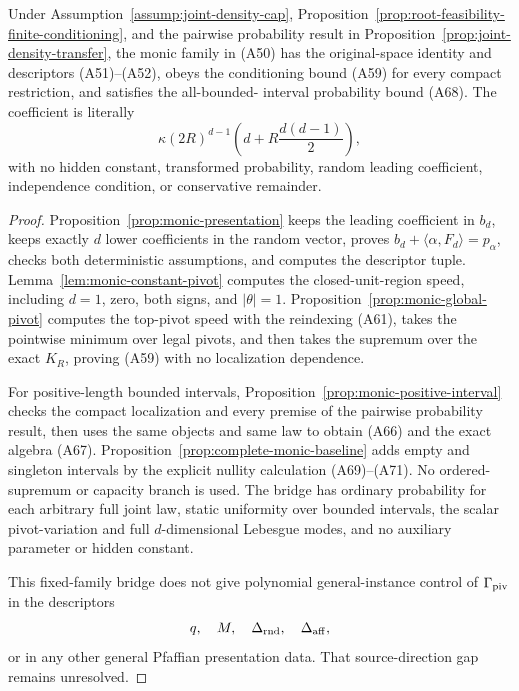 \begin{proposition}
\label{prop:exact-monic-recovery}
Under Assumption~\ref{assump:joint-density-cap},
Proposition~\ref{prop:root-feasibility-finite-conditioning}, and the
pairwise probability result in Proposition~\ref{prop:joint-density-transfer},
the monic family in \textup{(A50)} has the original-space identity and
descriptors \textup{(A51)}--\textup{(A52)}, obeys the conditioning bound
\textup{(A59)} for every compact restriction, and satisfies the all-bounded-
interval probability bound \textup{(A68)}.  The coefficient is literally
\[
\kappa(2R)^{d-1}\left(d+R\frac{d(d-1)}2\right),
\]
with no hidden constant, transformed probability, random leading
coefficient, independence condition, or conservative remainder.
\end{proposition}

\begin{proof}
Proposition~\ref{prop:monic-presentation} keeps the leading coefficient in
$b_d$, keeps exactly $d$ lower coefficients in the random vector, proves
$b_d+\langle\alpha,F_d\rangle=p_\alpha$, checks both deterministic
assumptions, and computes the descriptor tuple.  Lemma~\ref{lem:monic-constant-pivot}
computes the closed-unit-region speed, including $d=1$, zero, both signs,
and $|\theta|=1$.  Proposition~\ref{prop:monic-global-pivot} computes the
top-pivot speed with the reindexing \textup{(A61)}, takes the pointwise
minimum over legal pivots, and then takes the supremum over the exact
$K_R$, proving \textup{(A59)} with no localization dependence.

For positive-length bounded intervals,
Proposition~\ref{prop:monic-positive-interval} checks the compact
localization and every premise of the pairwise probability result, then
uses the same objects and same law to obtain \textup{(A66)} and the exact
algebra \textup{(A67)}.  Proposition~\ref{prop:complete-monic-baseline}
adds empty and singleton intervals by the explicit nullity calculation
\textup{(A69)}--\textup{(A71)}.  No ordered-supremum or capacity branch is
used.  The bridge has ordinary probability for each arbitrary full joint
law, static uniformity over bounded intervals, the scalar pivot-variation
and full $d$-dimensional Lebesgue modes, and no auxiliary parameter or
hidden constant.

This fixed-family bridge does not give polynomial general-instance control
of $\Gamma_{\rm piv}$ in the descriptors
\[
q,\quad M,\quad\Delta_{\rm rnd},\quad\Delta_{\rm aff},
\]
or in any other general Pfaffian presentation data.  That source-direction
gap remains unresolved.
\end{proof}

